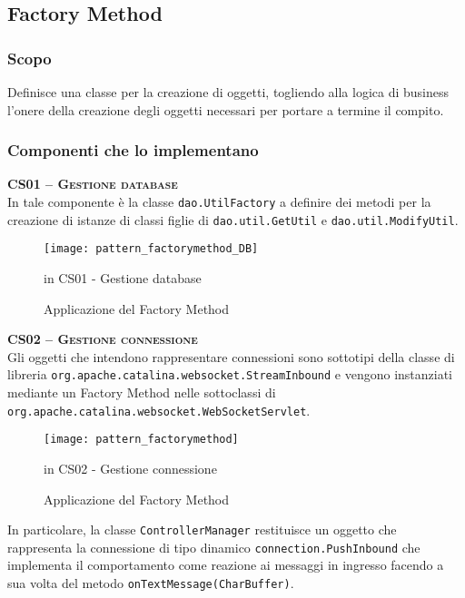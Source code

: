 \subsection{Factory Method}\label{sec:patternfactorymethod}

\subsubsection{Scopo}
Definisce una classe per la creazione di oggetti, togliendo alla logica di business l'onere della creazione degli oggetti necessari per portare a termine il compito.

\subsubsection{Componenti che lo implementano}
\begin{description}

	\item{\scshape\bfseries CS01 -- Gestione database}\\
In tale componente è la classe \texttt{dao.UtilFactory} a definire dei metodi per la creazione di istanze di classi figlie di \texttt{dao.util.GetUtil} e \texttt{dao.util.ModifyUtil}.

\begin{figure}[H]
  \centering
  \texttt{[image: pattern\_factorymethod\_DB]}
  \caption{Applicazione del  Factory Method}in \textsf{CS01 - Gestione database} \label{fig:factory_method}
\end{figure}


  \item{\scshape\bfseries CS02 -- Gestione connessione}\\
Gli oggetti che intendono rappresentare connessioni sono sottotipi della classe di libreria \texttt{org.apache.catalina.websocket.StreamInbound} e vengono instanziati mediante un Factory Method nelle sottoclassi di \texttt{org.apache.catalina.websocket.WebSocketServlet}.

\begin{figure}[H]
  \centering
  \texttt{[image: pattern\_factorymethod]}
  \caption{Applicazione del  Factory Method}in \textsf{CS02 - Gestione connessione}\label{fig:factory_method}
\end{figure}

In particolare, la classe \texttt{ControllerManager} restituisce un oggetto che rappresenta la connessione di tipo dinamico \texttt{connection.PushInbound} che implementa il comportamento come reazione ai messaggi in ingresso facendo a sua volta  del metodo \texttt{onTextMessage(CharBuffer)}.

\end{description}


